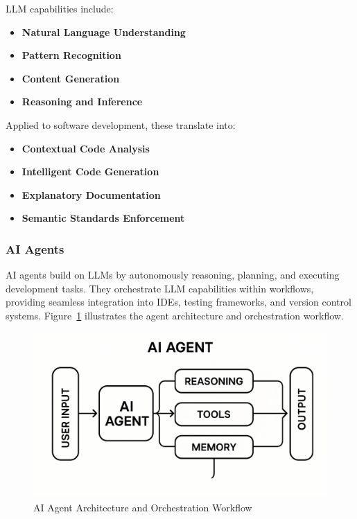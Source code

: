 \begin{spacing}{1.2}
LLM capabilities include:

\begin{itemize}
    \item \textbf{Natural Language Understanding}
    \item \textbf{Pattern Recognition}
    \item \textbf{Content Generation}
    \item \textbf{Reasoning and Inference}
\end{itemize}

Applied to software development, these translate into:

\begin{itemize}
    \item \textbf{Contextual Code Analysis}
    \item \textbf{Intelligent Code Generation}
    \item \textbf{Explanatory Documentation}
    \item \textbf{Semantic Standards Enforcement}
\end{itemize}

\subsubsection*{AI Agents}
AI agents build on LLMs by autonomously reasoning, planning, and executing development tasks. They orchestrate LLM capabilities within workflows, providing seamless integration into IDEs, testing frameworks, and version control systems. Figure~\ref{fig:ai_agent_workflow} illustrates the agent architecture and orchestration workflow.

\begin{figure}[H]
    \centering
    \includegraphics[scale=0.2]{Images/ai_agent.png}
    \caption{AI Agent Architecture and Orchestration Workflow}
    \label{fig:ai_agent_workflow}
\end{figure}


\end{spacing}
